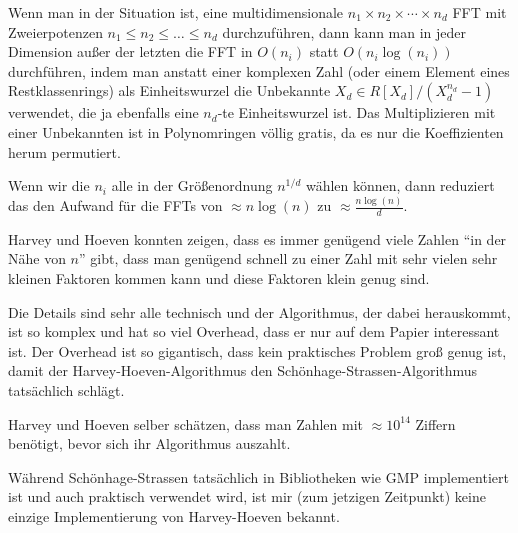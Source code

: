 \begin{remark}
    Wenn man in der Situation ist, eine multidimensionale $n_1\times n_2\times \cdots\times n_d$ FFT mit Zweierpotenzen $n_1\leq n_2\leq \ldots\leq n_d$ durchzuführen, dann kann man in jeder Dimension außer der letzten die FFT in $O(n_i)$ statt $O(n_i \log(n_i))$ durchführen, indem man anstatt einer komplexen Zahl (oder einem Element eines Restklassenrings) als Einheitswurzel die Unbekannte $X_d \in R[X_d]/(X_d^{n_d}-1)$ verwendet, die ja ebenfalls eine $n_d$-te Einheitswurzel ist. Das Multiplizieren mit einer Unbekannten ist in Polynomringen völlig gratis, da es nur die Koeffizienten herum permutiert.

    Wenn wir die $n_i$ alle in der Größenordnung $n^{1/d}$ wählen können, dann reduziert das den Aufwand für die FFTs von $\approx n\log(n)$ zu $\approx \frac{n\log(n)}{d}$.
\end{remark}

\begin{remark}
    Harvey und Hoeven konnten zeigen, dass es immer genügend viele Zahlen \enquote{in der Nähe von $n$} gibt, dass man genügend schnell zu einer Zahl mit sehr vielen sehr kleinen Faktoren kommen kann und diese Faktoren klein genug sind.
\end{remark}

\begin{remark}
    Die Details sind sehr alle technisch und der Algorithmus, der dabei herauskommt, ist so komplex und hat so viel Overhead, dass er nur auf dem Papier interessant ist. Der Overhead ist so gigantisch, dass kein praktisches Problem groß genug ist, damit der Harvey-Hoeven-Algorithmus den Schönhage-Strassen-Algorithmus tatsächlich schlägt.

    \smallskip
    Harvey und Hoeven selber schätzen, dass man Zahlen mit $\approx 10^{14}$ Ziffern benötigt, bevor sich ihr Algorithmus auszahlt.

    \medskip
    Während Schönhage-Strassen tatsächlich in Bibliotheken wie GMP implementiert ist und auch praktisch verwendet wird, ist mir (zum jetzigen Zeitpunkt) keine einzige Implementierung von Harvey-Hoeven bekannt.
\end{remark}